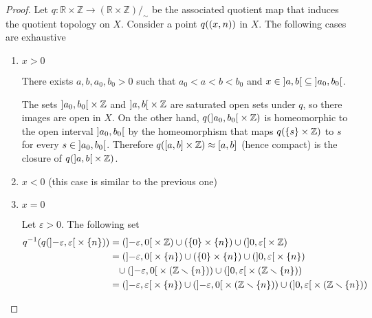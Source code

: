\begin{proof}
	Let $q: \mathbb{R}\times \mathbb{Z} \to (\mathbb{R}\times \mathbb{Z})/_{\sim}$ be the associated quotient map that induces the quotient topology on $X$. Consider a point $q(\left({x, n}\right))$ in $X$. The following cases are exhaustive
	\begin{enumerate}[label={\textbf{Case \arabic*.}}, itemindent=1cm]
		\item $x > 0$

		      There exists $a, b, a_{0}, b_{0} > 0$ such that $a_{0} < a < b < b_{0}$ and $x \in \left]{a, b}\right[ \subseteq \left]{a_{0}, b_{0}}\right[$.

		      The sets $\left]{a_{0}, b_{0}}\right[ \times \mathbb{Z}$ and $\left]{a, b}\right[ \times \mathbb{Z}$ are saturated open sets under $q$, so there images are open in $X$. On the other hand, $q(\left]{a_{0}, b_{0}}\right[ \times \mathbb{Z})$ is homeomorphic to the open interval $\left]{a_{0}, b_{0}}\right[$ by the homeomorphism that maps $q(\left\{{s}\right\} \times \mathbb{Z})$ to $s$ for every $s\in \left]{a_{0}, b_{0}}\right[$. Therefore $q(\left[{a, b}\right] \times \mathbb{Z}) \approx \left[{a, b}\right]$ (hence compact) is the closure of $q(\left]{a, b}\right[\times\mathbb{Z})$.
		\item $x < 0$ (this case is similar to the previous one)
		\item $x = 0$

		      Let $\varepsilon > 0$. The following set
		      \begin{align*}
			      q^{-1}(q(\left]{-\varepsilon, \varepsilon}\right[ \times \left\{{n}\right\})) & = (\left]{-\varepsilon, 0}\right[ \times \mathbb{Z}) \cup (\left\{{0}\right\} \times \left\{{n}\right\}) \cup (\left]{0, \varepsilon}\right[ \times \mathbb{Z})                                                                                \\
			                                                                         & = (\left]{-\varepsilon, 0}\right[ \times \left\{{n}\right\}) \cup (\left\{{0}\right\} \times \left\{{n}\right\}) \cup (\left]{0, \varepsilon}\right[ \times \left\{{n}\right\})                                                                                      \\
			                                                                         & \phantom{=} \cup (\left]{-\varepsilon, 0}\right[ \times (\mathbb{Z}\smallsetminus\left\{{n}\right\})) \cup (\left]{0, \varepsilon}\right[ \times (\mathbb{Z}\smallsetminus\left\{{n}\right\}))                                                 \\
			                                                                         & = (\left]{-\varepsilon, \varepsilon}\right[ \times \left\{{n}\right\}) \cup (\left]{-\varepsilon, 0}\right[ \times (\mathbb{Z}\smallsetminus\left\{{n}\right\})) \cup (\left]{0, \varepsilon}\right[ \times (\mathbb{Z}\smallsetminus\left\{{n}\right\}))
		      \end{align*}


\end{enumerate}
\end{proof}
